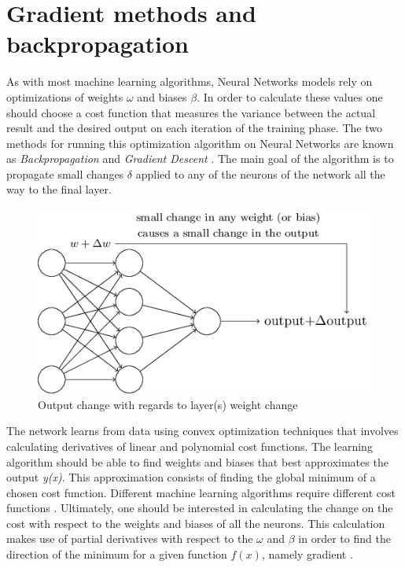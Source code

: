 \section{Gradient methods and backpropagation}

As with most machine learning algorithms, Neural Networks models rely on optimizations of weights $\omega$ and biases $\beta$. In order to calculate these values one should  choose a cost function that measures the variance between the actual result and the desired output on each iteration of the training phase. The two methods for running this optimization algorithm on Neural Networks are known as \textit{Backpropagation} and \textit{Gradient Descent} \cite{goodfellow2016_book}. The main goal of the algorithm is to propagate small changes $\delta$ applied to any of the neurons of the network all the way to the final layer.

\begin{figure}[h!]
	\centering
	\includegraphics[scale=0.5]{net_change.png}
	\caption{Output change with regards to layer(s) weight change \cite{nielsen2016}}
	\label{fig:net_change}
\end{figure}


The network learns from data using convex optimization techniques that involves calculating derivatives of linear and polynomial cost functions. The learning algorithm should be able to find weights and biases that best approximates the output \textit{y(x)}. This approximation consists of finding the global minimum of a chosen cost function. Different machine learning algorithms require different cost functions \cite{nielsen2016}. Ultimately, one should be interested in calculating the change on the cost with respect to the weights and biases of all the neurons. This calculation makes use of partial derivatives with respect to the $\omega$ and $\beta$ in order to find the direction of the minimum for a given function $f(x)$, namely gradient \cite{goodfellow2016_book}.

